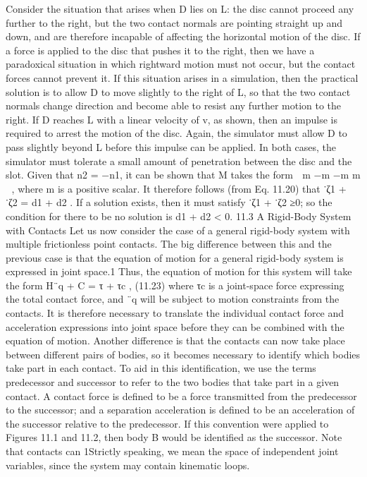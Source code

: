 Consider the situation that arises when D lies on L: the disc cannot proceed any further to the right, but the two contact normals are pointing straight up and down, and are therefore incapable of affecting the horizontal motion of the disc. If a force is applied to the disc that pushes it to the right, then we have a paradoxical situation in which rightward motion must not occur, but the contact forces cannot prevent it. If this situation arises in a simulation, then the practical solution is to allow D to move slightly to the right of L, so that the two contact normals change direction and become able to resist any further motion to the right. If D reaches L with a linear velocity of v, as shown, then an impulse is required to arrest the motion of the disc. Again, the simulator must allow D to pass slightly beyond L before this impulse can be applied. In both cases, the simulator must tolerate a small amount of penetration between the disc and the slot. Given that n2 = −n1, it can be shown that M takes the form  m −m −m m  , where m is a positive scalar. It therefore follows (from Eq. 11.20) that ˙ζ1 + ˙ζ2 = d1 + d2 . If a solution exists, then it must satisfy ˙ζ1 + ˙ζ2 ≥0; so the condition for there to be no solution is d1 + d2 < 0. 11.3 A Rigid-Body System with Contacts Let us now consider the case of a general rigid-body system with multiple frictionless point contacts. The big difference between this and the previous case is that the equation of motion for a general rigid-body system is expressed in joint space.1 Thus, the equation of motion for this system will take the form H¨q + C = τ + τc , (11.23) where τc is a joint-space force expressing the total contact force, and ¨q will be subject to motion constraints from the contacts. It is therefore necessary to translate the individual contact force and acceleration expressions into joint space before they can be combined with the equation of motion. Another difference is that the contacts can now take place between different pairs of bodies, so it becomes necessary to identify which bodies take part in each contact. To aid in this identification, we use the terms predecessor and successor to refer to the two bodies that take part in a given contact. A contact force is defined to be a force transmitted from the predecessor to the successor; and a separation acceleration is defined to be an acceleration of the successor relative to the predecessor. If this convention were applied to Figures 11.1 and 11.2, then body B would be identified as the successor. Note that contacts can 1Strictly speaking, we mean the space of independent joint variables, since the system may contain kinematic loops.


